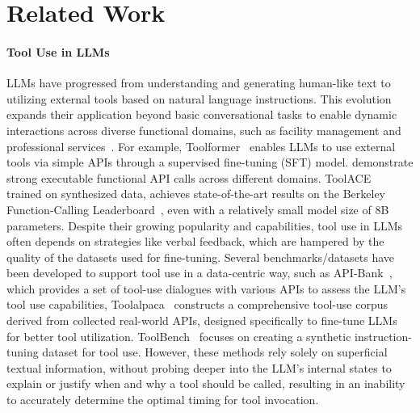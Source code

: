 \section{Related Work}
\paragraph{Tool Use in LLMs}
LLMs have progressed from understanding and generating human-like text to utilizing external tools based on natural language instructions. This evolution expands their application beyond basic conversational tasks to enable dynamic interactions across diverse functional domains, such as facility management and professional services~\citep{patil2023gorilla, liu2023bolaa,qin2023toolllm,chen2023agentverse}. For example, Toolformer~\citep{schick2024toolformer} enables LLMs to use external tools via simple APIs through a supervised fine-tuning (SFT) model. \cite{liuapigen} demonstrate strong executable functional API calls across different domains. ToolACE~\citep{liu2024toolace} trained on synthesized data, achieves state-of-the-art results on the Berkeley Function-Calling Leaderboard~\citep{berkeley-function-calling-leaderboard}, even with a relatively small model size of 8B parameters. Despite their growing popularity and capabilities, tool use in LLMs often depends on strategies like verbal feedback, which are hampered by the quality of the datasets used for fine-tuning. Several benchmarks/datasets have been developed to support tool use in a data-centric way, such as API-Bank~\citep{li2023comprehensive}, which provides a set of tool-use dialogues with various APIs to assess the LLM's tool use capabilities, Toolalpaca~\citep{tang2023toolalpaca} constructs a comprehensive tool-use corpus derived from collected real-world APIs, designed specifically to fine-tune LLMs for better tool utilization. ToolBench~\citep{qin2023toolllm} focuses on creating a synthetic instruction-tuning dataset for tool use. However, these methods rely solely on superficial textual information, without probing deeper into the LLM’s internal states to explain or justify when and why a tool should be called, resulting in an inability to accurately determine the optimal timing for tool invocation.

